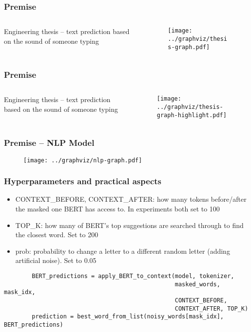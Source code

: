 \documentclass[../main.tex]{subfiles}
\begin{document}
\begin{frame}
	\frametitle{Premise}
	\begin{columns}
		\begin{column}{.68\textwidth}
			Engineering thesis -- text prediction based on the sound of someone
			typing
		\end{column}
		\begin{column}{0.28\textwidth}
			\begin{figure}
				\texttt{[image: ../graphviz/thesis-graph.pdf]}
			\end{figure}
		\end{column}
	\end{columns}
\end{frame}

\begin{frame}
	\frametitle{Premise}
	\begin{columns}
		\begin{column}{.68\textwidth}
			Engineering thesis -- text prediction based on the sound of someone
			typing
		\end{column}
		\begin{column}{0.28\textwidth}
			\begin{figure}
				\texttt{[image: ../graphviz/thesis-graph-highlight.pdf]}
			\end{figure}
		\end{column}
	\end{columns}
\end{frame}

\begin{frame}
	\frametitle{Premise -- NLP Model}
	\begin{figure}
		\texttt{[image: ../graphviz/nlp-graph.pdf]}
	\end{figure}
\end{frame}

\begin{frame}[fragile]
	\frametitle{Hyperparameters and practical aspects}
	\begin{itemize}
	\item
	CONTEXT\_BEFORE, CONTEXT\_AFTER: how many tokens before/after the masked
	one BERT has access to. In experiments both set to 100
	\item
	TOP\_K: how many of BERT's top suggestions are searched through to find
	the closest word. Set to 200
	\item
	prob: probability to change a letter to a different random letter
	(adding artificial noise). Set to 0.05
	\end{itemize}

	\begingroup
	\fontsize{8pt}{12pt}\selectfont
	\begin{verbatim}
		BERT_predictions = apply_BERT_to_context(model, tokenizer,
		                                         masked_words, mask_idx,
		                                         CONTEXT_BEFORE,
		                                         CONTEXT_AFTER, TOP_K)
		prediction = best_word_from_list(noisy_words[mask_idx], BERT_predictions)
	\end{verbatim}
	\endgroup
\end{frame}
\end{document}
